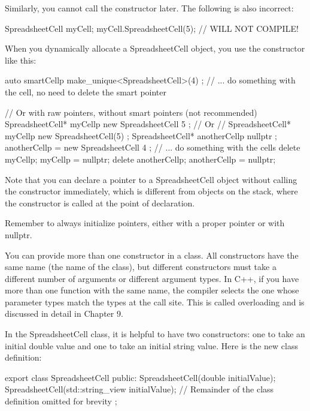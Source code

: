 Similarly, you cannot call the constructor later. The following is also incorrect:

\begin{cpp}
SpreadsheetCell myCell;
myCell.SpreadsheetCell(5); // WILL NOT COMPILE!
\end{cpp}


When you dynamically allocate a SpreadsheetCell object, you use the constructor like this:

\begin{cpp}
auto smartCellp { make_unique<SpreadsheetCell>(4) };
// ... do something with the cell, no need to delete the smart pointer

// Or with raw pointers, without smart pointers (not recommended)
SpreadsheetCell* myCellp { new SpreadsheetCell { 5 } };
// Or
// SpreadsheetCell* myCellp{ new SpreadsheetCell(5) };
SpreadsheetCell* anotherCellp { nullptr };
anotherCellp = new SpreadsheetCell { 4 };
// ... do something with the cells
delete myCellp; myCellp = nullptr;
delete anotherCellp; anotherCellp = nullptr;
\end{cpp}

Note that you can declare a pointer to a SpreadsheetCell object without calling the constructor immediately, which is different from objects on the stack, where the constructor is called at the point of declaration.

Remember to always initialize pointers, either with a proper pointer or with nullptr.


You can provide more than one constructor in a class. All constructors have the same name (the name of the class), but different constructors must take a different number of arguments or different argument types. In C++, if you have more than one function with the same name, the compiler selects the one whose parameter types match the types at the call site. This is called overloading and is discussed in detail in Chapter 9.

In the SpreadsheetCell class, it is helpful to have two constructors: one to take an initial double value and one to take an initial string value. Here is the new class definition:

\begin{cpp}
export class SpreadsheetCell
{
    public:
        SpreadsheetCell(double initialValue);
        SpreadsheetCell(std::string_view initialValue);
        // Remainder of the class definition omitted for brevity
};
\end{cpp}

